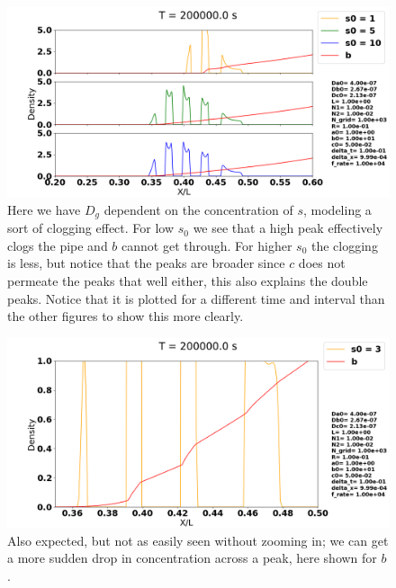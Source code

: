 \documentclass[1p]{elsarticle}        	%
\begin{document}
\begin{figure}
	\centering
	\includegraphics[width=\linewidth]{../figures/s0_1-10.png}
	\caption{Here we have $D_g$ dependent on the concentration of $s$, modeling a sort of clogging effect. For low $s_0$ we see that a high peak effectively clogs the pipe and $b$ cannot get through. For higher $s_0$ the clogging is less, but notice that the peaks are broader since $c$ does not permeate the peaks that well either, this also explains the double peaks. Notice that it is plotted for a different time and interval than the other figures to show this more clearly.}
	\label{fig:coords}
\end{figure}

\begin{figure}
	\centering
	\includegraphics[width=\linewidth]{../figures/s0_3.png}
	\caption{Also expected, but not as easily seen without zooming in; we can get a more sudden drop in concentration across a peak, here shown for $b$.}
	\label{fig:coords}
\end{figure}
\end{document}
